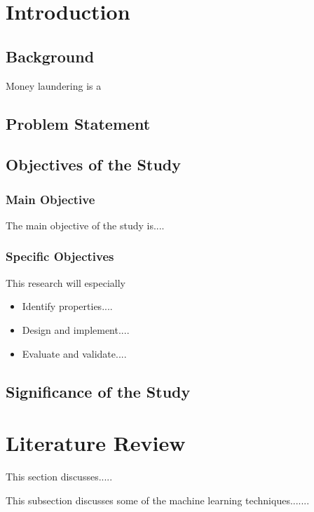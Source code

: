 \documentclass[letterpaper,12pt]{article}
\begin{document}
\printnomenclature[3cm]
                
\pagebreak 
{}
\section{Introduction} \label{intro}
\subsection{Background}
Money laundering is a ~\cite{ali2020evaluation}~\cite{azamuke2022scenario}

\subsection{Problem Statement} \label{pspr}



\subsection{Objectives of the Study}
\subsubsection{Main Objective}
The main objective of the study is....

\subsubsection{Specific Objectives}
This research will especially 
\begin{itemize}
    \item[(i)] Identify properties....
    \item[(ii)] Design and implement....
    \item[(iii)] Evaluate and validate....
\end{itemize}


\subsection{Significance of the Study}



\newpage
\section{Literature Review} \label{literature}
This section discusses.....

This subsection discusses some of the machine learning techniques.......
\end{document}
